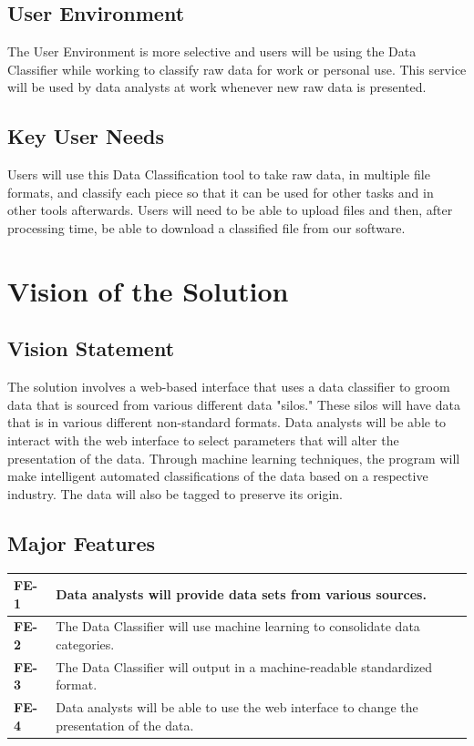 \documentclass[12pt,oneside,letterpaper]{article}
\begin{document}
\subsection{User Environment}
The User Environment is more selective and users will be using the Data Classifier while working to classify raw data for work or personal use. This service will be used by data analysts at work whenever new raw data is presented.

\subsection{Key User Needs}
Users will use this Data Classification tool to take raw data, in multiple file formats, and classify each piece so that it can be used for other tasks and in other tools afterwards. Users will need to be able to upload files and then, after processing time, be able to download a classified file from our software.


\section{Vision of the Solution}
\subsection{Vision Statement}
The solution involves a web-based interface that uses a data classifier to groom data that is sourced from various different data "silos." These silos will have data that is in various different non-standard formats.
\newline
\newline
Data analysts will be able to interact with the web interface to select parameters that will alter the presentation of the data. Through machine learning techniques, the program will make intelligent automated classifications of the data based on a respective industry. The data will also be tagged to preserve its origin.  
\subsection{Major Features}
\begin{tabular}{|p{1in}p{4.5in}|}
\hline
\textbf{FE-1}&Data analysts will provide data sets from various sources.\\
\hline
\textbf{FE-2}&The Data Classifier will use machine learning to consolidate data categories.\\
\hline
\textbf{FE-3}&The Data Classifier will output in a machine-readable standardized format.\\
\hline
\textbf{FE-4}&Data analysts will be able to use the web interface to change the presentation of the data.\\
\hline
\end{tabular}
\end{document}
